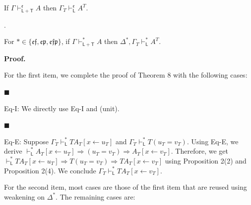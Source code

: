 \documentclass[10pt,a4paper]{article}
\begin{document}
If $\Gamma\vdash_{\mathsf{L}+\mathsf{T}}^{\mathfrak{e}}A$ then $\Gamma_{T}\vdash_{\mathsf{L}}^{\mathfrak{e}}A^{T}$.\par
 
 
 
\par{}. 
 
For $*\in\{\mathfrak{e}\mathfrak{f},\mathfrak{e}\mathfrak{p},\mathfrak{e}\mathfrak{f}\mathfrak{p}\}$, if $\Gamma\vdash_{\mathsf{L}+\mathsf{T}}^{*}A$ then $\Delta^{*},\Gamma_{T}\vdash_{\mathsf{L}}^{*}A^{T}$.\par
 
 
  
 
 
 
 
\par\medskip\noindent\textbf{Proof.}\par
 
 
For the first item, we complete the proof of Theorem 8 with the following cases:\par
  
\par\noindent  $\blacksquare$ 
 
Eq-I: We directly use Eq-I and (unit).\par
 
 
 
\par\noindent  $\blacksquare$ 
 
Eq-E: Suppose $\Gamma_{T}\vdash_{\mathsf{L}}^{*}TA_{T}[x\leftarrow u_{T}]$ and $\Gamma_{T}\vdash_{\mathsf{L}}^{*}T(u_{T}=v_{T})$. Using Eq-E, we derive $\vdash_{\mathsf{L}}^{*}A_{T}[x\leftarrow u_{T}]\mathbin{\Rightarrow}(u_{T}=v_{T})\mathbin{\Rightarrow}A_{T}[x\leftarrow v_{T}]$. Therefore, we get $\vdash_{\mathsf{L}}^{*}TA_{T}[x\leftarrow u_{T}]\mathbin{\Rightarrow}T(u_{T}=v_{T})\mathbin{\Rightarrow}TA_{T}[x\leftarrow v_{T}]$ using Proposition 2(2) and Proposition 2(4). We conclude $\Gamma_{T}\vdash_{\mathsf{L}}^{*}TA_{T}[x\leftarrow v_{T}]$.\par
 
 
  
For the second item, most cases are those of the first item that are reused using weakening on $\Delta^{*}$. The remaining cases are:\par
  
\end{document}
